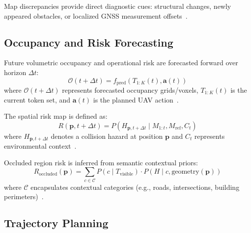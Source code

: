Map discrepancies provide direct diagnostic cues: structural changes, newly appeared obstacles, or localized GNSS measurement offsets~\cite{pomianek2026s4dtam, yue2025airground}.

\subsection{Occupancy and Risk Forecasting}
\label{subsec:occupancy_forecasting_math}

Future volumetric occupancy and operational risk are forecasted forward over horizon $\Delta t$:
\begin{equation}
  \mathcal{O}(t+\Delta t) = f_{\text{pred}}(T_{1:K}(t), \mathbf{a}(t))
\end{equation}
where $\mathcal{O}(t+\Delta t)$ represents forecasted occupancy grids/voxels, $T_{1:K}(t)$ is the current token set, and $\mathbf{a}(t)$ is the planned UAV action~\cite{yu2025driveoccworld, mei2025irwm, liao2025i2world, zheng2024gaussianad}.

The spatial risk map is defined as:
\begin{equation}
  R(\mathbf{p}, t+\Delta t) = P(H_{\mathbf{p}, t+\Delta t} \mid M_{1:t}, M_{\text{ref}}, C_t)
\end{equation}
where $H_{\mathbf{p}, t+\Delta t}$ denotes a collision hazard at position $\mathbf{p}$ and $C_t$ represents environmental context~\cite{pomianek2026s4dtam, liu2025hybrid}.

Occluded region risk is inferred from semantic contextual priors:
\begin{equation}
  R_{\text{occluded}}(\mathbf{p}) = \sum_{c \in \mathcal{C}} P(c \mid T_{\text{visible}}) \cdot P(H \mid c, \mathrm{geometry}(\mathbf{p}))
\end{equation}
where $\mathcal{C}$ encapsulates contextual categories (e.g., roads, intersections, building perimeters)~\cite{pomianek2026s4dtam, cai2024neusis, liu2025hybrid}.

\subsection{Trajectory Planning}
\label{subsec:trajectory_planning}

